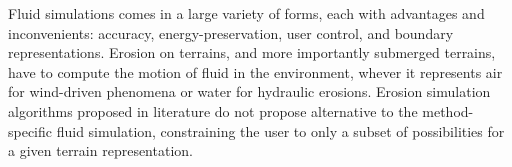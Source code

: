 \midConclusion



\midConclusion

Fluid simulations comes in a large variety of forms, each with advantages and inconvenients: accuracy, energy-preservation, user control, and boundary representations. Erosion on terrains, and more importantly submerged terrains, have to compute the motion of fluid in the environment, whever it represents air for wind-driven phenomena or water for hydraulic erosions. Erosion simulation algorithms proposed in literature do not propose alternative to the method-specific fluid simulation, constraining the user to only a subset of possibilities for a given terrain representation.
